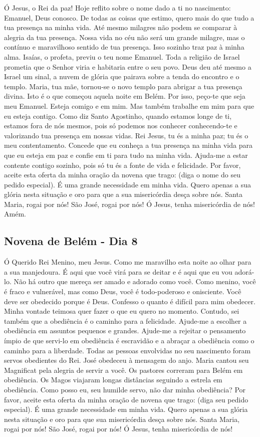 \documentclass[a4paper,14pt,twoside]{extarticle} \usepackage[utf8]{inputenc}
\begin{document}
Ó Jesus, o Rei da paz! Hoje reflito sobre o nome dado a ti no nascimento: Emanuel, Deus conosco. De todas as coisas que estimo, quero mais do que tudo a tua presença na minha vida. Até mesmo milagres não podem se comparar à alegria da tua presença. Nossa vida no céu não será um grande milagre, mas o contínuo e maravilhoso sentido de tua presença. Isso sozinho traz paz à minha alma. Isaías, o profeta, previu o teu nome Emanuel. Toda a religião de Israel prometia que o Senhor viria e habitaria entre o seu povo. Deus deu até mesmo a Israel um sinal, a nuvem de glória que pairava sobre a tenda do encontro e o templo. Maria, tua mãe, tornou-se o novo templo para abrigar a tua presença divina. Isto é o que começou aquela noite em Belém. Por isso, peço-te que seja meu Emanuel. Esteja comigo e em mim. Mas também trabalhe em mim para que eu esteja contigo. Como diz Santo Agostinho, quando estamos longe de ti, estamos fora de nós mesmos, pois só podemos nos conhecer conhecendo-te e valorizando tua presença em nossas vidas. Rei Jesus, tu és a minha paz; tu és o meu contentamento. Concede que eu conheça a tua presença na minha vida para que eu esteja em paz e confie em ti para tudo na minha vida. Ajuda-me a estar contente contigo sozinho, pois só tu és a fonte de vida e felicidade. Por favor, aceite esta oferta da minha oração da novena que trago: (diga o nome do seu pedido especial). É uma grande necessidade em minha vida. Quero apenas a sua glória nesta situação e oro para que a sua misericórdia desça sobre nós. Santa Maria, rogai por nós! São José, rogai por nós! Ó Jesus, tenha misericórdia de nós!
Amém.

\subsection{Novena de Belém - Dia 8}

Ó Querido Rei Menino, meu Jesus. Como me maravilho esta noite ao olhar para a sua manjedoura. É aqui que você virá para se deitar e é aqui que eu vou adorá-lo. Não há outro que mereça ser amado e adorado como você. Como menino, você é fraco e vulnerável, mas como Deus, você é todo-poderoso e onisciente. Você deve ser obedecido porque é Deus. Confesso o quanto é difícil para mim obedecer. Minha vontade teimosa quer fazer o que eu quero no momento. Contudo, sei também que a obediência é o caminho para a felicidade. Ajude-me a escolher a obediência em assuntos pequenos e grandes. Ajude-me a rejeitar o pensamento ímpio de que servi-lo em obediência é escravidão e a abraçar a obediência como o caminho para a liberdade. Todas as pessoas envolvidas no seu nascimento foram servos obedientes do Rei. José obedeceu à mensagem do anjo. Maria cantou seu Magnificat pela alegria de servir a você. Os pastores correram para Belém em obediência. Os Magos viajaram longas distâncias seguindo a estrela em obediência. Como posso eu, seu humilde servo, não dar minha obediência? Por favor, aceite esta oferta da minha oração de novena que trago: (diga seu pedido especial). É uma grande necessidade em minha vida. Quero apenas a sua glória nesta situação e oro para que sua misericórdia desça sobre nós. Santa Maria, rogai por nós! São José, rogai por nós! Ó Jesus, tenha misericórdia de nós!
\end{document}
